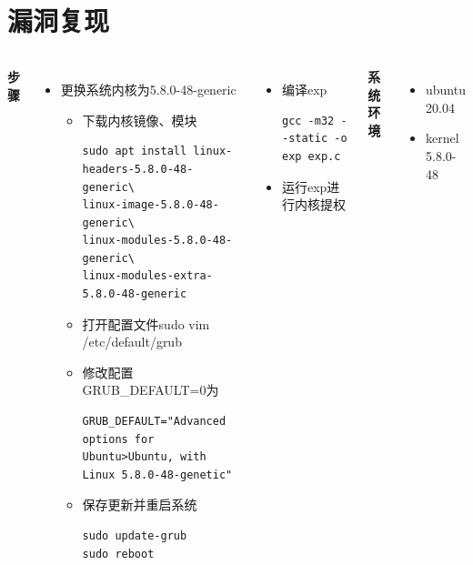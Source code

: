 \documentclass[xcolor=table]{beamer}
\begin{document}
\section{漏洞复现}

\begin{frame}[fragile]

\begin{columns}
\small\textbf{步骤}

\begin{itemize}
	\footnotesize\item 更换系统内核为5.8.0-48-generic
	\begin{itemize}
		\footnotesize\item 下载内核镜像、模块
		
\tiny\begin{lstlisting}
sudo apt install linux-headers-5.8.0-48-generic\
linux-image-5.8.0-48-generic\
linux-modules-5.8.0-48-generic\
linux-modules-extra-5.8.0-48-generic
\end{lstlisting}
		
		\footnotesize\item 打开配置文件sudo vim /etc/default/grub
		\footnotesize\item 修改配置GRUB\_DEFAULT=0为
\tiny\begin{lstlisting}
GRUB_DEFAULT="Advanced options for Ubuntu>Ubuntu, with Linux 5.8.0-48-genetic"
\end{lstlisting}
		\footnotesize\item 保存更新并重启系统
\tiny\begin{lstlisting}
sudo update-grub
sudo reboot
\end{lstlisting}
	\end{itemize}
\end{itemize}
	

\begin{itemize}
	\footnotesize\item 编译exp
\tiny\begin{lstlisting}
gcc -m32 --static -o exp exp.c
\end{lstlisting}
	\footnotesize\item 运行exp进行内核提权
\end{itemize}

\small\textbf{系统环境}

\footnotesize\begin{itemize}
	\item ubuntu 20.04
	\item kernel 5.8.0-48
\end{itemize}


\end{columns}





\end{frame}
\end{document}
